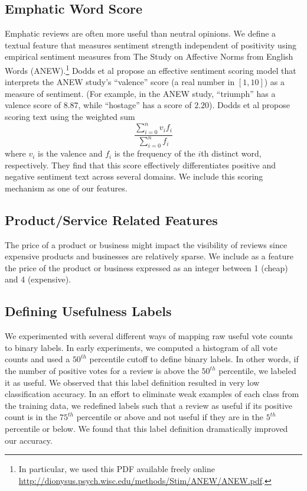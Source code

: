 \documentclass[letterpaper]{article}
\begin{document}
\subsection{Emphatic Word Score}
Emphatic reviews are often more useful than neutral opinions.  We define a 
textual feature that measures sentiment strength independent of positivity
using empirical sentiment measures from The Study on Affective Norms from 
English Words (ANEW)\cite{BradleyANEW}.\footnote{In particular, we used this PDF 
available freely online \url{http://dionysus.psych.wisc.edu/methods/Stim/ANEW/ANEW.pdf}.}
Dodds et al \cite{DoddsANEWPaper} propose an effective sentiment scoring model 
that interprets the ANEW study's ``valence'' score (a real number in $[1,10]$) 
as a measure of sentiment.  (For example, in the ANEW study, ``triumph'' has a 
valence score of $8.87$, while ``hostage'' has a score of $2.20$).  Dodds et al 
propose scoring text using the weighted sum 
\[
    \frac{\sum^n_{i=0} v_i f_i}{\sum^n_{i=0} f_i}
\]
where $v_i$ is the valence and $f_i$ is the frequency of the $i$th distinct
word, respectively.  They find that this score effectively differentiates
positive and negative sentiment text across several domains.  We include
this scoring mechanism as one of our features.

\subsection{Product/Service Related Features}
The price of a product or business might impact the visibility of reviews
since expensive products and businesses are relatively sparse.  We include
as a feature the price of the product or business expressed as an integer 
between 1 (cheap) and 4 (expensive).

\subsection{Defining Usefulness Labels}
We experimented with several different ways of mapping raw useful vote
counts to binary labels.  In early experiments, we computed a histogram
of all vote counts and used a $50^{th}$ percentile cutoff to define binary
labels. In other words, if the number of positive votes
for a review is above the $50^{th}$ percentile, we labeled it as
useful. We observed that this label definition resulted in very low
classification accuracy.  In an effort to eliminate weak examples of 
each class from the training data, we redefined labels such that a review as
useful if its positive count is in the $75^{th}$ percentile or above
and not useful if they are in the $5^{th}$ percentile or below.  We found that
this label definition dramatically improved our accuracy.
\end{document}
